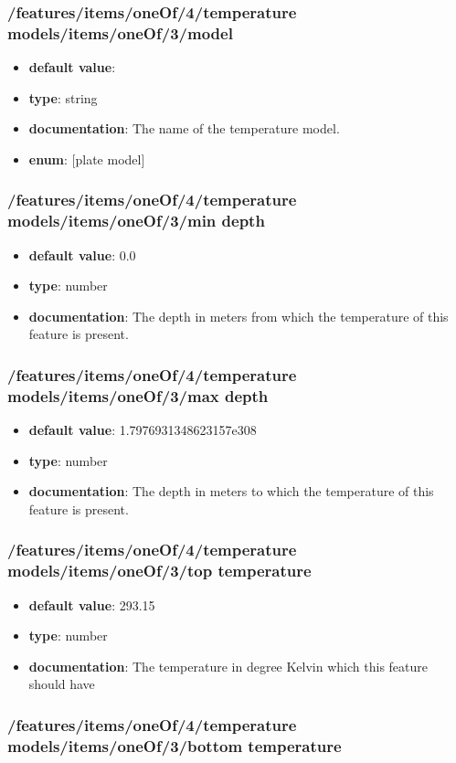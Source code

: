 \subsubsection{/features/items/oneOf/4/temperature models/items/oneOf/3/model}
\begin{itemize}\item {\bf default value}: 
\item {\bf type}: string
\item {\bf documentation}: The name of the temperature model.
\item {\bf enum}: [plate model]\end{itemize}\subsubsection{/features/items/oneOf/4/temperature models/items/oneOf/3/min depth}
\begin{itemize}\item {\bf default value}: 0.0
\item {\bf type}: number
\item {\bf documentation}: The depth in meters from which the temperature of this feature is present.
\end{itemize}\subsubsection{/features/items/oneOf/4/temperature models/items/oneOf/3/max depth}
\begin{itemize}\item {\bf default value}: 1.7976931348623157e308
\item {\bf type}: number
\item {\bf documentation}: The depth in meters to which the temperature of this feature is present.
\end{itemize}\subsubsection{/features/items/oneOf/4/temperature models/items/oneOf/3/top temperature}
\begin{itemize}\item {\bf default value}: 293.15
\item {\bf type}: number
\item {\bf documentation}: The temperature in degree Kelvin which this feature should have
\end{itemize}\subsubsection{/features/items/oneOf/4/temperature models/items/oneOf/3/bottom temperature}
